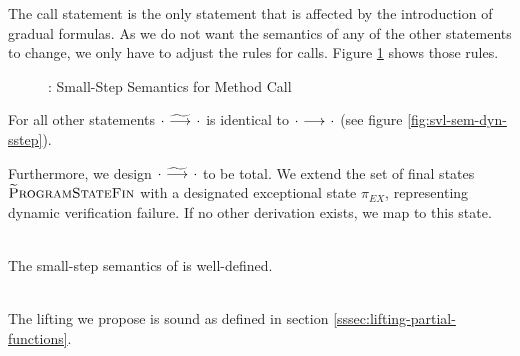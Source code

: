 The call statement is the only statement that is affected by the introduction of gradual formulas.
As we do not want the semantics of any of the other statements to change, we only have to adjust the rules for calls.
Figure \ref{fig:gvl-sem-dyn-sstep} shows those rules.
\begin{figure}
    \boxed{\gsstep{\pi}{\pi}}
    
    \caption{\gvlidf: Small-Step Semantics for Method Call}
    \label{fig:gvl-sem-dyn-sstep}
\end{figure}
For all other statements ${\cdot} \,\,{\widetilde{\longrightarrow}^{}}\,\, {\cdot}$ is identical to ${\cdot} \,\,{\longrightarrow^{}}\,\, {\cdot}$ (see figure \ref{fig:svl-sem-dyn-sstep}).

Furthermore, we design ${\cdot} \,\,{\widetilde{\longrightarrow}^{}}\,\, {\cdot}$ to be total.
We extend the set of final states $\textup{\textsc{\ensuremath{\widetilde{\text{P}}}rogramStateFin}}$ with a designated exceptional state $\pi_{EX}$, representing dynamic verification failure.
If no other derivation exists, we map to this state.

\begin{lemma}\label{lemma:gss-wd}~\\
    The small-step semantics of \gvlidf is well-defined.
\end{lemma}

\begin{lemma}\label{lemma:gss-sl}~\\
    The lifting we propose is sound as defined in section \ref{sssec:lifting-partial-functions}.
\end{lemma}